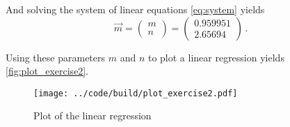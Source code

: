 And solving the system of linear equations \autoref{eq:system} yields
\begin{equation}
    \vec{m} = 
    \begin{pmatrix}
        m \\ 
        n
    \end{pmatrix}
    =
    \begin{pmatrix}
        0.959951 \\ 
        2.65694
    \end{pmatrix} \, .
\end{equation}

Using these parameters $m$ and $n$ to plot a linear regression yields \autoref{fig:plot_exercise2}.

\begin{figure}
    \centering
    \texttt{[image: ../code/build/plot\_exercise2.pdf]}
    \caption{Plot of the linear regression}
    \label{fig:plot_exercise2}
\end{figure}